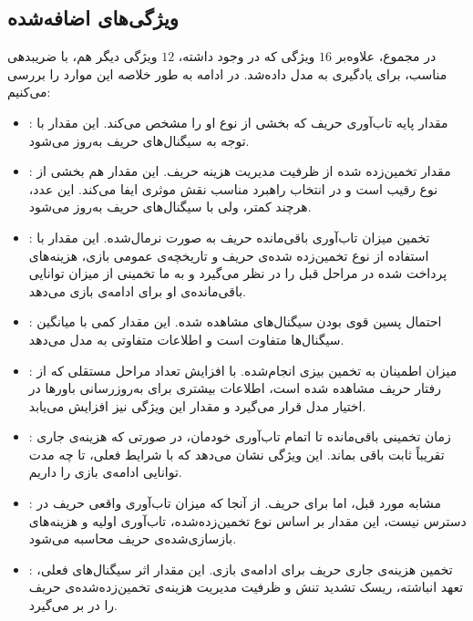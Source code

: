\documentclass[12pt]{article}
\begin{document}
\subsection{ویژگی‌های اضافه‌شده}
در مجموع، علاوه‌بر $16$
ویژگی که در 
وجود داشته، $12$
ویژگی دیگر هم، با ضریبدهی مناسب، برای یادگیری به مدل داده‌شد. 
در ادامه به طور خلاصه این موارد را بررسی می‌کنیم:

\begin{itemize}
    \item {}:
    مقدار پایه تاب‌آوری حریف که بخشی از نوع او را مشخص می‌کند.
    این مقدار با توجه به سیگنال‌های حریف به‌روز می‌شود.

    \item {}:
    مقدار تخمین‌زده شده از ظرفیت مدیریت هزینه حریف. این مقدار هم بخشی از نوع رقیب است
    و در انتخاب راهبرد مناسب نقش موثری ایفا می‌کند. این عدد، هرچند کمتر، ولی با سیگنال‌های حریف به‌روز می‌شود.

    \item {}:
    تخمین میزان تاب‌آوری باقی‌مانده حریف به صورت نرمال‌شده.
    این مقدار با استفاده از نوع تخمین‌زده‌ شده‌ی حریف و تاریخچه‌ی عمومی بازی،
    هزینه‌های پرداخت‌ شده در مراحل قبل را در نظر می‌گیرد و به ما تخمینی از
    میزان توانایی باقی‌مانده‌ی او برای ادامه‌ی بازی می‌دهد.

    \item {}:
    احتمال پسین قوی بودن سیگنال‌های مشاهده شده. این مقدار کمی با میانگین سیگنال‌ها متفاوت است
    و اطلاعات متفاوتی به مدل می‌دهد.

    \item {}:
    میزان اطمینان به تخمین بیزی انجام‌شده.
    با افزایش تعداد مراحل مستقلی که از رفتار حریف مشاهده شده است،
    اطلاعات بیشتری برای به‌روزرسانی باورها در اختیار مدل قرار می‌گیرد
    و مقدار این ویژگی نیز افزایش می‌یابد.

    \item {}:
    زمان تخمینی باقی‌مانده تا اتمام تاب‌آوری خودمان، در صورتی که
    هزینه‌ی جاری تقریباً ثابت باقی بماند.
    این ویژگی نشان می‌دهد که با شرایط فعلی، تا چه مدت توانایی ادامه‌ی بازی را داریم.

    \item {}:
    مشابه مورد قبل، اما برای حریف.
    از آنجا که میزان تاب‌آوری واقعی حریف در دسترس نیست، این مقدار بر اساس
    نوع تخمین‌زده‌شده، تاب‌آوری اولیه و هزینه‌های بازسازی‌شده‌ی حریف محاسبه می‌شود.

    \item {}:
    تخمین هزینه‌ی جاری حریف برای ادامه‌ی بازی.
    این مقدار اثر سیگنال‌های فعلی، تعهد انباشته، ریسک تشدید تنش و
    ظرفیت مدیریت هزینه‌ی تخمین‌زده‌شده‌ی حریف را در بر می‌گیرد.


\end{itemize}
\end{document}
